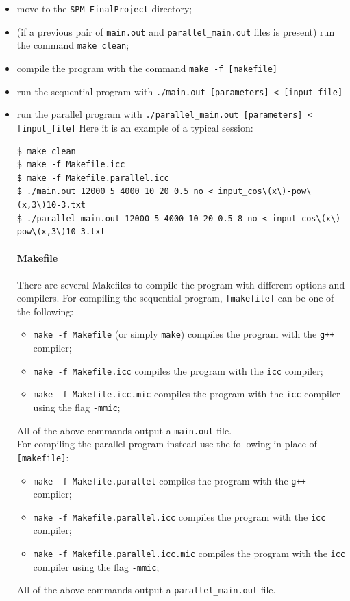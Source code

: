 \documentclass[10pt]{article}
\numberwithin{equation}{section}
\begin{document}
\begin{itemize}
\item move to the \verb|SPM_FinalProject| directory;
\item (if a previous pair of \verb|main.out| and \verb|parallel_main.out| files is present) run the command \verb|make clean|; 
\item compile the program with the command \verb|make -f [makefile]|
\item run the sequential program with \verb|./main.out [parameters] < [input_file]|
\item run the parallel program with \verb|./parallel_main.out [parameters] < [input_file]|
Here it is an example of a typical session:
\begin{verbatim}
$ make clean
$ make -f Makefile.icc
$ make -f Makefile.parallel.icc
$ ./main.out 12000 5 4000 10 20 0.5 no < input_cos\(x\)-pow\(x,3\)10-3.txt
$ ./parallel_main.out 12000 5 4000 10 20 0.5 8 no < input_cos\(x\)-pow\(x,3\)10-3.txt
\end{verbatim}
\paragraph{Makefile}
There are several Makefiles to compile the program with different options and compilers. For compiling the sequential program, \verb|[makefile]| can be one of the following:
\begin{itemize}
	\item \verb|make -f Makefile| (or simply \verb|make|) compiles the program with the \verb|g++| compiler;
	\item \verb|make -f Makefile.icc| compiles the program with the \verb|icc| compiler;
	\item \verb|make -f Makefile.icc.mic| compiles the program with the \verb|icc| compiler using the flag \verb|-mmic|;
\end{itemize}
All of the above commands output a \verb|main.out| file.\\
For compiling the parallel program instead use the following in place of \verb|[makefile]|:
\begin{itemize}
	\item \verb|make -f Makefile.parallel| compiles the program with the \verb|g++| compiler;
	\item \verb|make -f Makefile.parallel.icc| compiles the program with the \verb|icc| compiler;
	\item \verb|make -f Makefile.parallel.icc.mic| compiles the program with the \verb|icc| compiler using the flag \verb|-mmic|;
\end{itemize}
All of the above commands output a \verb|parallel_main.out| file.

\end{itemize}
\end{document}
